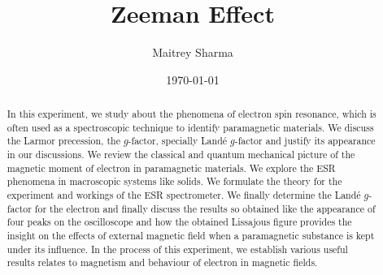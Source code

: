 \documentclass[%
 reprint,
nofootinbib,
 amsmath,amssymb,
 aps,
floatfix,
]{revtex4-2}
\begin{document}

\title{Zeeman Effect}%


\author{Maitrey Sharma}




\date{\today}%

\begin{abstract}
    In this experiment, we study about the phenomena of electron spin resonance, which is often used as a spectroscopic technique to identify paramagnetic materials. We discuss the Larmor precession, the $g$-factor, specially Land\'e $g$-factor and justify its appearance in our discussions. We review the classical and quantum mechanical picture of the magnetic moment of electron in paramagnetic materials. We explore the ESR phenomena in macroscopic systems like solids. We formulate the theory for the experiment and workings of the ESR spectrometer. We finally determine the Land\'e $g$-factor for the electron and finally discuss the results so obtained like the appearance of four peaks on the oscilloscope and how the obtained Lissajous figure provides the insight on the effects of external magnetic field when a paramagnetic substance is kept under its influence. In the process of this experiment, we establish various useful results relates to magnetism and behaviour of electron in magnetic fields.
\end{abstract}

\maketitle

\end{document}
